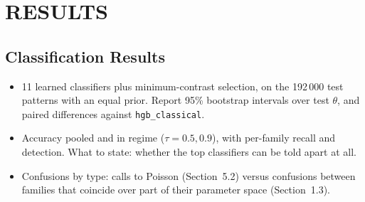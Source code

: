 \documentclass[twoside]{article}
\begin{document}
\begin{table}[t]
\caption{[PLACEHOLDER — Power of candidate end-to-end scores to separate the true model from CSR, by family and
departure bin.]}
\label{tab:power}
\end{table}

\section{RESULTS}

\subsection{Classification Results}
\begin{itemize}
  \item 11 learned classifiers plus minimum-contrast selection, on the 192\,000 test patterns with an equal prior.
        Report 95\% bootstrap intervals over test $\theta$, and paired differences against \texttt{hgb\_classical}.
  \item Accuracy pooled and in regime ($\tau=0.5,0.9$), with per-family recall and detection. What to state:
        whether the top classifiers can be told apart at all.
  \item Confusions by type: calls to Poisson (Section~5.2) versus confusions between families that coincide over
        part of their parameter space (Section~1.3).
\end{itemize}

\begin{table}[t]
\caption{[PLACEHOLDER — Eight-way classification: accuracy overall and in regime, and recall per family, for every
classifier and the minimum-contrast baseline.]}
\label{tab:classification}
\end{table}
\end{document}
